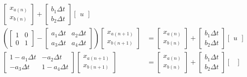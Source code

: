 \documentclass[11pt]{article}
\begin{document}
\begin{subequations}
\begin{align}
    \begin{bmatrix}
      x_{a(n)} \\
      x_{b(n)}
    \end{bmatrix} +
    \begin{bmatrix}
      b_1\Delta t \\
      b_2\Delta t
    \end{bmatrix}
    \begin{bmatrix}
      u
    \end{bmatrix} \\
    \left(
    \begin{bmatrix}
      1 & 0 \\
      0 & 1
    \end{bmatrix} -
    \begin{bmatrix}
      a_1\Delta t & a_2\Delta t \\
      a_3\Delta t & a_4\Delta t
    \end{bmatrix}
    \right)
    \begin{bmatrix}
      x_{a(n+1)} \\
      x_{b(n+1)}
    \end{bmatrix} &=
    \begin{bmatrix}
      x_{a(n)} \\
      x_{b(n)}
    \end{bmatrix} +
    \begin{bmatrix}
      b_1\Delta t \\
      b_2\Delta t
    \end{bmatrix}
    \begin{bmatrix}
      u
    \end{bmatrix} \\
    \begin{bmatrix}
      1 - a_1\Delta t & - a_2\Delta t \\
      - a_3\Delta t & 1 - a_4\Delta t
    \end{bmatrix}
    \begin{bmatrix}
      x_{a(n+1)} \\
      x_{b(n+1)}
    \end{bmatrix} &=
    \begin{bmatrix}
      x_{a(n)} \\
      x_{b(n)}
    \end{bmatrix} +
    \begin{bmatrix}
      b_1\Delta t \\
      b_2\Delta t
    \end{bmatrix}
    \begin{bmatrix}

\end{bmatrix}
\end{align}
\end{subequations}
\end{document}
